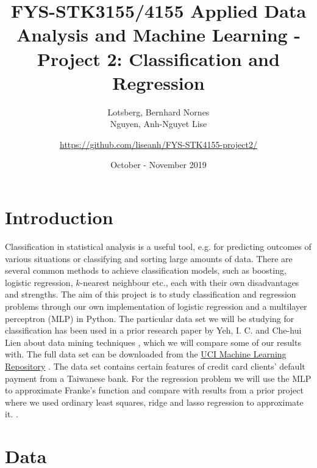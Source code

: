 \documentclass[a4paper, 11pt, twocolumn]{article}
\title{FYS-STK3155/4155 Applied Data Analysis and Machine Learning - Project 2: Classification and Regression }
\author{Lotsberg, Bernhard Nornes \\ Nguyen, Anh-Nguyet Lise \and
\url{https://github.com/liseanh/FYS-STK4155-project2/}}
\date{October - November 2019}
\begin{document}

\section{Introduction}
Classification in statistical analysis is a useful tool, e.g. for predicting
outcomes of various situations or classifying and sorting large amounts of data. 
There are several common methods to achieve classification models, such as 
boosting, logistic regression, $k$-nearest neighbour etc., each with their own 
disadvantages and strengths. 
The aim of this project is  to study classification and regression problems
through our own implementation of logistic regression and a multilayer perceptron
(MLP) in Python. The particular data set we will be studying for classification
has been used in a prior research paper by Yeh, I. C. and Che-hui Lien about
data mining techniques \cite{origarticle}, which we will compare some of our
results with.  The full data set can be downloaded from the 
\href{https://archive.ics.uci.edu/ml/datasets/default+of+credit+card+clients}{UCI Machine
Learning Repository} \cite{UCI}. The data set contains certain features of
credit card clients' default payment from a Taiwanese bank.
For the regression problem we will use the MLP to approximate Franke's function
and compare with results from a prior project where we used ordinary least
squares, ridge and lasso regression to approximate it. \cite{regpaper}.


\section{Data}
\end{document}
